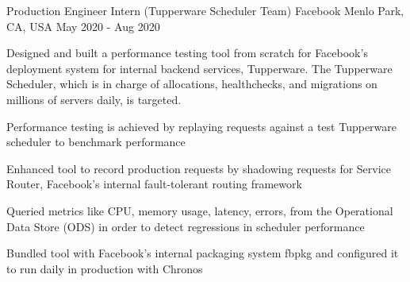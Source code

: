 

\begin{cventries}


  \cventry
  {Production Engineer Intern (Tupperware Scheduler Team)} %
    {Facebook} %
    {Menlo Park, CA, USA} %
    {May 2020 - Aug 2020} %
    {
      \begin{cvitems} 
	      \item {Designed and built a performance testing tool from scratch for Facebook's deployment system for internal backend services, Tupperware. The Tupperware Scheduler, which is in charge of allocations, healthchecks, and migrations on millions of servers daily, is targeted.}
	      \item {Performance testing is achieved by replaying requests against a test Tupperware scheduler to benchmark performance}
	      \item {Enhanced tool to record production requests by shadowing requests for Service Router, Facebook's internal fault-tolerant routing framework}
	      \item {Queried metrics like CPU, memory usage, latency, errors, from the Operational Data Store (ODS) in order to detect regressions in scheduler performance}
	      \item {Bundled tool with Facebook's internal packaging system fbpkg and configured it to run daily in production with Chronos}
      \end{cvitems}
    }


\end{cventries}
